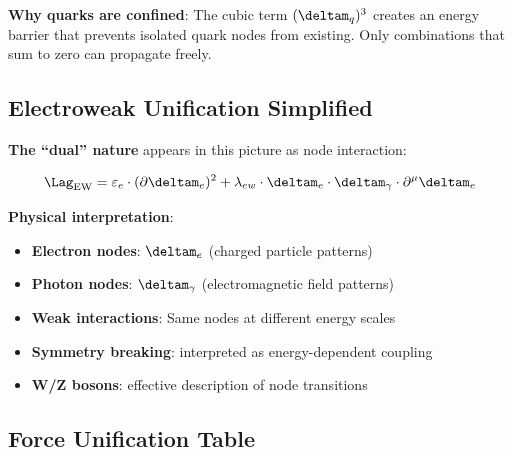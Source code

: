 	\textbf{Why quarks are confined}:
	The cubic term $(\deltam_q)^3$ creates an energy barrier that prevents isolated quark nodes from existing. Only combinations that sum to zero can propagate freely.
	
	\subsection{Electroweak Unification Simplified}
	
	\textbf{The ``dual'' nature} appears in this picture as node interaction:
	
	\begin{equation}
		\Lag_{\text{EW}} = \varepsilon_e \cdot (\partial \deltam_e)^2 + \lambda_{ew} \cdot \deltam_e \cdot \deltam_\gamma \cdot \partial^\mu \deltam_e
	\end{equation}
	
	\textbf{Physical interpretation}:
	\begin{itemize}
		\item \textbf{Electron nodes}: $\deltam_e$ (charged particle patterns)
		\item \textbf{Photon nodes}: $\deltam_\gamma$ (electromagnetic field patterns)
		\item \textbf{Weak interactions}: Same nodes at different energy scales
		\item \textbf{Symmetry breaking}: interpreted as energy-dependent coupling
		\item \textbf{W/Z bosons}: effective description of node transitions
	\end{itemize}
	
	\subsection{Force Unification Table}
	
